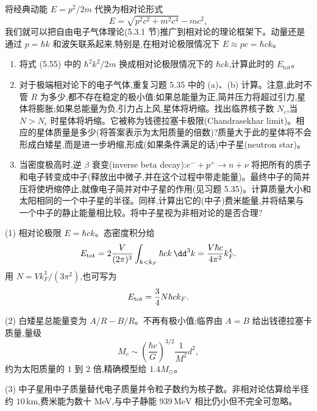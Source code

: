 \begin{question}
将经典动能 $E=p^2/2m$ 代换为相对论形式
\[
E=\sqrt{p^2c^2+m^2c^4}-mc^2,
\]
我们就可以把自由电子气体理论(5.3.1 节)推广到相对论的理论框架下。动量还是通过 $p=\hbar k$ 和波矢联系起来,特别是,在相对论极限情况下 $E\approx pc=\hbar ck$。
\begin{enumerate}
\item 将式 (5.55) 中的 $\hbar^2k^2/2m$ 换成相对论极限情况下的 $\hbar ck$,计算此时的 $E_{\mathrm{tot}}$。
\item 对于极端相对论下的电子气体,重复习题 5.35 中的 (a)、(b) 计算。注意,此时不管 $R$ 为多少,都不存在稳定的极小值;如果总能量为正,简并压力将超过引力,星体将膨胀;如果总能量为负,引力占上风,星体将坍缩。找出临界核子数 $N_c$,当 $N>N_c$ 时星体将坍缩。它被称为钱德拉塞卡极限(Chandrasekhar limit)。相应的星体质量是多少(将答案表示为太阳质量的倍数)?质量大于此的星体将不会形成白矮星,而是进一步坍缩,形成(如果条件满足的话)中子星(neutron star)。
\item 当密度极高时,逆 $\beta$ 衰变(inverse beta decay):$e^-+p^+\to n+\nu$ 将把所有的质子和电子转变成中子(释放出中微子,并在这个过程中带走能量)。最终中子的简并压将使坍缩停止,就像电子简并对中子星的作用(见习题 5.35)。计算质量大小和太阳相同的一个中子星的半径。同样,计算出它的(中子)费米能量,并将结果与一个中子的静止能量相比较。将中子星视为非相对论的是否合理?
\end{enumerate}

\par\smallskip
{}

\begin{solution}

(1) 相对论极限 $E=\hbar ck$。态密度积分给
\[
E_{\rm tot}=2\frac{V}{(2\pi)^3}\int_{k<k_F}\hbar ck\,\dd^3k
=\frac{V\hbar c}{4\pi^2}k_F^4.
\]
用 $N=Vk_F^3/(3\pi^2)$,也可写为
\[
E_{\rm tot}=\frac34N\hbar ck_F.
\]

(2) 白矮星总能量变为 $A/R-B/R$。不再有极小值;临界由 $A=B$ 给出钱德拉塞卡质量,量级
\[
M_c\sim \left(\frac{\hbar c}{G}\right)^{3/2}\frac{1}{M^2}d^2,
\]
约为太阳质量的 $1$ 到 $2$ 倍,精确模型给 $1.4M_\odot$。

(3) 中子星用中子质量替代电子质量并令粒子数约为核子数。非相对论估算给半径约 $10\,\mathrm{km}$,费米能为数十 MeV,与中子静能 $939\,\mathrm{MeV}$ 相比仍小但不完全可忽略。

\end{solution}
\end{question}

